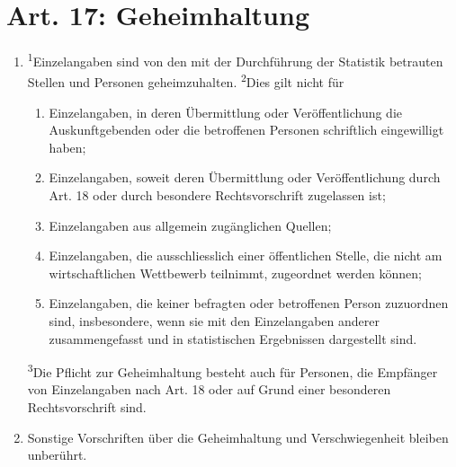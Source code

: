 \documentclass[A4, 12pt]{scrbook}
\begin{document}
    \section{Art. 17: Geheimhaltung}
        \begin{enumerate}[label=(\arabic*)]
            \item \textsuperscript{1}Einzelangaben sind von den mit der Durchführung der Statistik betrauten Stellen und Personen geheimzuhalten. \textsuperscript{2}Dies gilt nicht für
                \begin{enumerate}[label=\arabic*.]
                    \item Einzelangaben, in deren Übermittlung oder Veröffentlichung die Auskunftgebenden oder die betroffenen Personen schriftlich eingewilligt haben;
                    \item Einzelangaben, soweit deren Übermittlung oder Veröffentlichung durch Art. 18 oder durch besondere Rechtsvorschrift zugelassen ist;
                    \item Einzelangaben aus allgemein zugänglichen Quellen;
                    \item Einzelangaben, die ausschliesslich einer öffentlichen Stelle, die nicht am wirtschaftlichen Wettbewerb teilnimmt, zugeordnet werden können;
                    \item Einzelangaben, die keiner befragten oder betroffenen Person zuzuordnen sind, insbesondere, wenn sie mit den Einzelangaben anderer zusammengefasst und in statistischen Ergebnissen dargestellt sind.
                \end{enumerate}
            \textsuperscript{3}Die Pflicht zur Geheimhaltung besteht auch für Personen, die Empfänger von Einzelangaben nach Art. 18 oder auf Grund einer besonderen Rechtsvorschrift sind.
            \item Sonstige Vorschriften über die Geheimhaltung und Verschwiegenheit bleiben unberührt.
        \end{enumerate}
\end{document}
